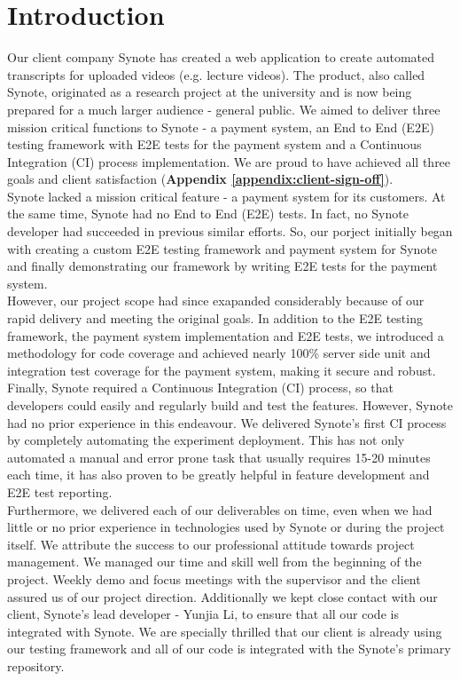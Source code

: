 \chapter{Introduction}
\label{chap:introduction}

Our client company Synote has created a web application to create automated transcripts for uploaded videos (e.g. lecture videos). The product, also called Synote, originated as a research project at the university and is now being prepared for a much larger audience - general public. We aimed to deliver three mission critical functions to Synote - a payment system, an End to End (E2E) testing framework with E2E tests for the payment system and a Continuous Integration (CI) process implementation. We are proud to have achieved all three goals and client satisfaction (\textbf{Appendix \ref{appendix:client-sign-off}}).\\

Synote lacked a mission critical feature - a payment system for its customers. At the same time, Synote had no End to End (E2E) tests. In fact, no Synote developer had succeeded in previous similar efforts. So, our porject initially began with creating a custom E2E testing framework and payment system for Synote and finally demonstrating our framework by writing E2E tests for the payment system.\\

However, our project scope had since exapanded considerably because of our rapid delivery and meeting the original goals. In addition to the E2E testing framework, the payment system implementation and E2E tests, we introduced a methodology for code coverage and achieved nearly 100\% server side unit and integration test coverage for the payment system, making it secure and robust.\\

Finally, Synote required a Continuous Integration (CI) process, so that developers could easily and regularly build and test the features. However, Synote had no prior experience in this endeavour. We delivered Synote's first CI process by completely automating the experiment deployment. This has not only automated a manual and error prone task that usually requires 15-20 minutes each time, it has also proven to be greatly helpful in feature development and E2E test reporting.\\

Furthermore, we delivered each of our deliverables on time, even when we had little or no prior experience in technologies used by Synote or during the project itself. We attribute the success to our professional attitude towards project management. We managed our time and skill well from the beginning of the project. Weekly demo and focus meetings with the supervisor and the client assured us of our project direction. Additionally we kept close contact with our client, Synote's lead developer - Yunjia Li, to ensure that all our code is integrated with Synote. We are specially thrilled that our client is already using our testing framework and all of our code is integrated with the Synote's primary repository.\\

